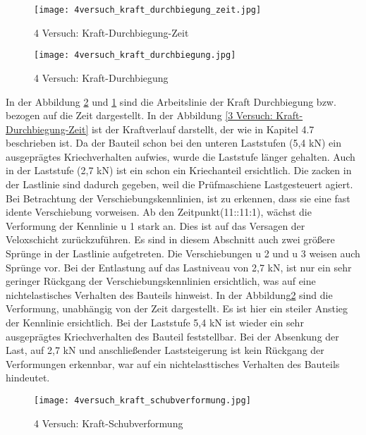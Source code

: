 \documentclass[12 pt,a4 paper ]{scrreprt}
\begin{document}
\begin{figure}
	\texttt{[image: 4versuch\_kraft\_durchbiegung\_zeit.jpg]}
	\caption{4 Versuch: Kraft-Durchbiegung-Zeit}
	\label{4 Versuch: Kraft-Durchbiegung-Zeit}
\end{figure}


\begin{figure}	
	\texttt{[image: 4versuch\_kraft\_durchbiegung.jpg]}
	\caption{4 Versuch: Kraft-Durchbiegung}
	\label{4 Versuch: Kraft-Durchbiegung}
\end{figure}



In der Abbildung \ref{4 Versuch: Kraft-Durchbiegung} und \ref{4 Versuch: Kraft-Durchbiegung-Zeit} sind die Arbeitslinie der Kraft Durchbiegung bzw. bezogen auf die Zeit dargestellt. In der Abbildung \ref{3 Versuch: Kraft-Durchbiegung-Zeit} ist der Kraftverlauf darstellt, der wie in Kapitel 4.7 beschrieben ist.  Da der Bauteil schon bei den unteren Laststufen (5,4 kN) ein ausgeprägtes Kriechverhalten aufwies, wurde die Laststufe länger gehalten. Auch in der Laststufe (2,7 kN) ist ein schon ein Kriechanteil ersichtlich. Die zacken in der Lastlinie sind dadurch gegeben, weil die Prüfmaschiene Lastgesteuert agiert. Bei Betrachtung der Verschiebungskennlinien, ist zu erkennen, dass sie eine fast idente Verschiebung vorweisen. Ab den Zeitpunkt(11::11:1), wächst die Verformung der Kennlinie u 1 stark an. Dies ist auf das Versagen der Veloxschicht zurückzuführen. Es sind in diesem Abschnitt auch zwei größere Sprünge in der Lastlinie aufgetreten. Die Verschiebungen u 2 und u 3 weisen auch Sprünge vor. Bei der Entlastung auf das Lastniveau von 2,7 kN, ist nur ein sehr geringer Rückgang der Verschiebungskennlinien ersichtlich, was auf eine nichtelastisches Verhalten des Bauteils hinweist. 
In der Abbildung\ref{4 Versuch: Kraft-Durchbiegung} sind die Verformung, unabhängig von der Zeit dargestellt. Es ist hier ein steiler Anstieg der Kennlinie ersichtlich. Bei der Laststufe 5,4 kN ist wieder ein sehr ausgeprägtes Kriechverhalten des Bauteil feststellbar. Bei der Absenkung der Last, auf 2,7 kN und anschließender Laststeigerung ist kein Rückgang der Verformungen erkennbar, war auf ein nichtelasttisches Verhalten des Bauteils hindeutet.


\begin{figure}
\begin{center}
\texttt{[image: 4versuch\_kraft\_schubverformung.jpg]}
\caption{4 Versuch: Kraft-Schubverformung}
\label{4_versuch_kraft_schubverschiebung}
\end{center}
\end{figure}
\end{document}
